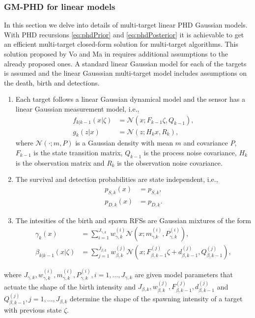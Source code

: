         \subsubsection{GM-PHD for linear models}
\label{sec:gmphdFilter}
In this section we delve into details of multi-target linear PHD Gaussian models. With PHD recursions \eqref{eq:phdPrior} and \eqref{eq:phdPosterior} it is achievable to get an efficient multi-target closed-form solution for multi-target algorithms. This solution proposed by Vo and Ma in \cite{VoMaPHD2006} requires additional assumptions to the already proposed ones. A standard linear Gaussian model for each of the targets is assumed and the linear Gausssian multi-target model includes assumptions on the death, birth and detections.
\begin{enumerate}[start=4]
    \item  Each target follows a linear Gaussian dynamical model and the sensor has a linear Gaussian measurement model, i.e., \label{as:phd_4}
        \begin{align}
            f_{k|k-1}(x|\zeta) &= \mathcal{N}(x; F_{k-1}\zeta, Q_{k-1}), \label{eq:phd_linear_model_state}\\
            g_k(z|x) &= \mathcal{N}(z;H_kx, R_k), \label{eq:phd_linear_model_measurements}
        \end{align}
        where $\mathcal{N}(\cdot;m,P)$ is a Gaussian density with mean $m$ and covariance $P$, $F_{k-1}$ is the state transition matrix, $Q_{k-1}$ is the process noise covariance, $H_k$ is the observation matrix and $R_k$ is the observation noise covariance.
    \item The survival and detection probabilities are state independent, i.e., \label{as:phd_5}
        \begin{align}
            p_{S,k}(x) &= p_{S,k}, \label{eq:phd_ps}\\
            p_{D,k}(x) &= p_{D,k}. \label{eq:phd_pd}
        \end{align}
    \item The intesities of the birth and spawn RFSs are Gaussian mixtures of the form \label{as:phd_6}
        \begin{align}
            \gamma_k(x) &= \sum_{i=1}^{J_{\gamma,k}}w_{\gamma,k}^{(i)} \mathcal{N}(x; m_{\gamma.k}^{(i)}, P_{\gamma,k}^{(i)}), \label{eq:phd_birth_intensity} \\
            \beta_{k|k-1}(x|\zeta) &= \sum_{j=1}^{J_{\beta,k}} w_{\beta,k}^{(j)} \mathcal{N}(x;F_{\beta,k-1}^{(j)}\zeta + d_{\beta,k-1}^{(j)}, Q_{\beta,k-1}^{(j)}), \label{eq:phd_spawning_intensity}
        \end{align}
\end{enumerate}
where $J_{\gamma,k}, w_{\gamma,k}^{(i)}, m_{\gamma,k}^{(i)}, P_{\gamma,k}^{(i)}, i=1,\dots, J_{\gamma,k}$ are given model parameters that actuate the shape of the birth intensity and $J_{\beta,k}, w_{\beta,k}^{(j)}, F_{\beta,k-1}^{(j)}, d_{\beta,k-1}^{(j)}$ and $Q_{\beta,k-1}^{(j)}, j=1,\dots, J_{\beta,k}$ determine the shape of the spawning intensity of a target with previous state $\zeta$.


